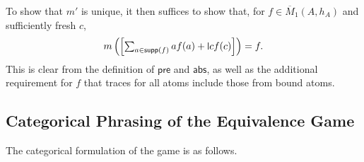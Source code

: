 \documentclass[a4paper,UKenglish,cleveref,thm-restate,numberwithinsect,final]{lipics-v2021}
\newcommand{\pre}{\mathsf{pre}}
\newcommand{\abs}{\mathsf{abs}}
\newcommand{\supp}{\mathsf{supp}}
\newcommand{\mbar}{\overline{M}_1}
\theoremstyle{plain}
\newcommand{\midmid}{\hspace{0.2ex}{\rule[-0.1ex]{0.6pt}{1.65ex}}\hspace{0.2ex}}
\newcommand{\newletter}[1]{{\midmid}#1}
\numberwithin{equation}{section}
\newcommand{\+}[1]{\mathcal{#1}\xspace}
\theoremstyle{definition}
\begin{document}
To show that \(m'\) is unique, it then suffices to show that, for \(f \in \mbar(A, h_A)\) and sufficiently fresh \(c\),
\begin{equation*}\textstyle
  m\left( \left[ \sum_{a \in \supp(f)} a f(a) + \newletter{c} f(c) \right] \right) = f.
\end{equation*}
This is clear from the definition of \(\pre\) and \(\abs\), as well as the additional requirement for \(f\) that traces for all atoms include those from bound atoms.


\subsection*{Categorical Phrasing of the Equivalence Game}

The categorical formulation of the game is as follows.
\end{document}
